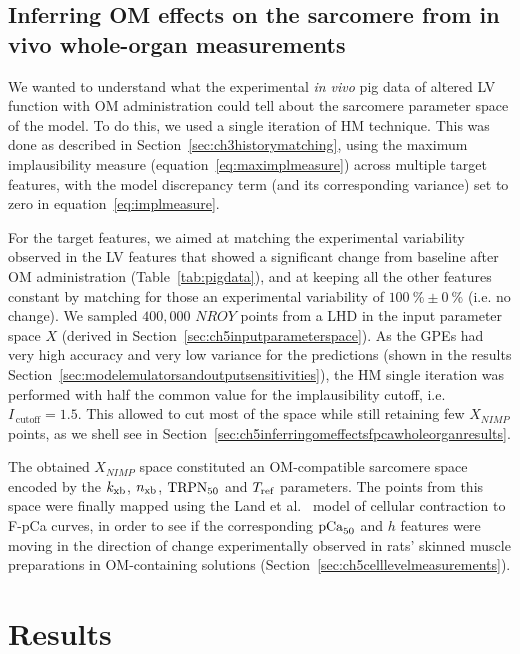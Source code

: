 \subsection{Inferring OM effects on the sarcomere from in vivo whole-organ measurements}\label{sec:ch5inferringomeffectsfpcawholeorgan}
We wanted to understand what the experimental \textit{in vivo} pig data of altered LV function with OM administration could tell about the sarcomere parameter space of the model. To do this, we used a single iteration of HM technique. This was done as described in Section~\ref{sec:ch3historymatching}, using the maximum implausibility measure
(equation~\eqref{eq:maximplmeasure}) across multiple target features, with the model discrepancy term (and its corresponding variance) set to zero in equation~\eqref{eq:implmeasure}.

\vspace{0.2cm}
For the target features, we aimed at matching the experimental variability observed in the LV features that showed a significant change from baseline after OM administration (Table~\ref{tab:pigdata}), and at keeping all the other features constant by matching for those an experimental variability of $\SI{100}{\percent}\pm\SI{0}{\percent}$ (i.e. no change). We sampled $400,000$ $NROY$ points from a LHD in the input parameter space $X$ (derived in Section~\ref{sec:ch5inputparameterspace}). As the GPEs had very high accuracy and very low variance for the predictions (shown in the results Section~\ref{sec:modelemulatorsandoutputsensitivities}), the HM single iteration was performed with half the common value for the implausibility cutoff, i.e. $I_{\,\textrm{cutoff}}=1.5$. This allowed to cut most of the space while still retaining few $X_{NIMP}$ points, as we shell see in Section~\ref{sec:ch5inferringomeffectsfpcawholeorganresults}.

\vspace{0.2cm}
The obtained $X_{NIMP}$ space constituted an OM-compatible sarcomere space encoded by the $k_{\textrm{xb}}$, $n_{\textrm{xb}}$, $\textrm{TRPN}_{50}$ and $T_{\textrm{ref}}$ parameters. The points from this space were finally mapped using the Land et al.~\cite{Land:2012} model of cellular contraction to F-pCa curves, in order to see if the corresponding $\textrm{pCa}_{50}$ and $h$ features were moving in the direction of change experimentally observed in rats' skinned muscle preparations in OM-containing solutions (Section~\ref{sec:ch5celllevelmeasurements}).


%
%
%
\section{Results}\label{sec:ch5results}


